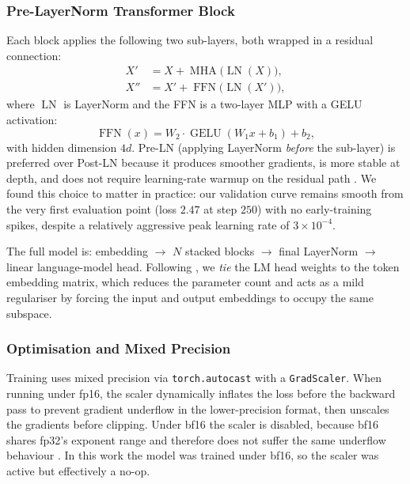 \subsubsection{Pre-LayerNorm Transformer Block}
Each block applies the following two sub-layers, both wrapped in a
residual connection:
\begin{align}
X' &= X + \operatorname{MHA}\!\bigl(\operatorname{LN}(X)\bigr),
\label{eq:block1}\\
X'' &= X' + \operatorname{FFN}\!\bigl(\operatorname{LN}(X')\bigr),
\label{eq:block2}
\end{align}
where $\operatorname{LN}$ is LayerNorm and the FFN is a two-layer MLP with
a GELU activation:
\begin{equation}
\operatorname{FFN}(x) = W_2 \cdot \operatorname{GELU}(W_1 x + b_1) + b_2,
\label{eq:ffn}
\end{equation}
with hidden dimension $4d$. Pre-LN (applying LayerNorm \emph{before} the
sub-layer) is preferred over Post-LN because it produces smoother
gradients, is more stable at depth, and does not require learning-rate
warmup on the residual path \parencite{xiong2020layer}. We found this
choice to matter in practice: our validation curve remains smooth from
the very first evaluation point (loss $2.47$ at step $250$) with no
early-training spikes, despite a relatively aggressive peak learning
rate of $3 \times 10^{-4}$.

\noindent The full model is: embedding $\rightarrow$ $N$ stacked blocks $\rightarrow$
final LayerNorm $\rightarrow$ linear language-model head. Following
\textcite{radford2019language}, we \emph{tie} the LM head weights to the
token embedding matrix, which reduces the parameter count and acts as a
mild regulariser by forcing the input and output embeddings to occupy the
same subspace.

\subsubsection{Optimisation and Mixed Precision}
Training uses mixed precision via \texttt{torch.autocast} with a
\texttt{GradScaler}. When running under fp16, the scaler dynamically
inflates the loss before the backward pass to prevent gradient underflow
in the lower-precision format, then unscales the gradients before
clipping. Under bf16 the scaler is disabled, because bf16 shares fp32's
exponent range and therefore does not suffer the same underflow behaviour
\parencite{micikevicius2018mixed}. In this work the model was trained
under bf16, so the scaler was active but effectively a no-op.


